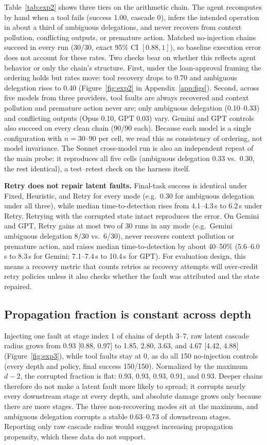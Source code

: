 \documentclass[11pt,a4paper]{article}
\begin{document}
Table~\ref{tab:exp2} shows three tiers on the arithmetic chain. The agent
recomputes by hand when a tool fails (success 1.00, cascade 0), infers the
intended operation in about a third of ambiguous delegations, and never recovers
from context pollution, conflicting outputs, or premature action. Matched
no-injection chains succeed in every run (30/30, exact 95\% CI $[0.88, 1]$),
so baseline execution error does not account for these rates. Two checks
bear on whether this reflects agent behavior or only the chain's structure.
First, under the loan-approval framing the ordering holds but rates move: tool
recovery drops to 0.70 and ambiguous delegation rises to 0.40
(Figure~\ref{fig:exp2} in Appendix~\ref{app:figs}). Second, across five models
from three providers, tool faults are always recovered and context pollution
and premature action never are; only ambiguous delegation (0.10--0.33) and
conflicting outputs (Opus 0.10, GPT 0.03) vary. Gemini and GPT controls also
succeed on every clean chain (90/90 each). Because each model is a single
configuration with $n{=}30$--$90$ per cell, we read this as consistency of
ordering, not model invariance. The Sonnet cross-model run is also an independent repeat of the main
probe: it reproduces all five cells (ambiguous delegation 0.33 vs.\ 0.30, the
rest identical), a test--retest check on the harness itself.

\textbf{Retry does not repair latent faults.} Final-task success is identical
under Fixed, Heuristic, and Retry for every mode (e.g.\ 0.30 for ambiguous
delegation under all three), while median time-to-detection rises from 4.1--4.3\,s
to 6.2\,s under Retry. Retrying with the corrupted state intact reproduces the
error. On Gemini and GPT, Retry gains at most two of 30 runs in any mode
(e.g.\ Gemini ambiguous delegation 8/30 vs.\ 6/30), never recovers context
pollution or premature action, and raises median time-to-detection by about
40--50\% (5.6--6.0\,s to 8.3\,s for Gemini; 7.1--7.4\,s to 10.4\,s for GPT). For evaluation design, this means a recovery metric that counts retries
as recovery attempts will over-credit retry policies unless it also checks
whether the fault was attributed and the state repaired.

\subsection{Propagation fraction is constant across depth}
\label{sec:exp3}
Injecting one fault at stage index 1 of chains of depth 3--7, raw latent
cascade radius grows from 0.93 [0.88, 0.97] to 1.85, 2.80, 3.63, and 4.67
[4.42, 4.88] (Figure~\ref{fig:exp3}), while tool faults stay at 0, as do all
150 no-injection controls (every depth and policy, final success 150/150). Normalized by
the maximum $d{-}2$, the corrupted fraction is flat: 0.93, 0.93, 0.93, 0.91,
and 0.93. Deeper chains therefore do not make a latent fault more likely to
spread; it corrupts nearly every downstream stage at every depth, and absolute
damage grows only because there are more stages. The three non-recovering modes
sit at the maximum, and ambiguous delegation corrupts a stable 0.63--0.73 of
downstream stages. Reporting only raw cascade radius would suggest increasing
propagation propensity, which these data do not support.
\end{document}
